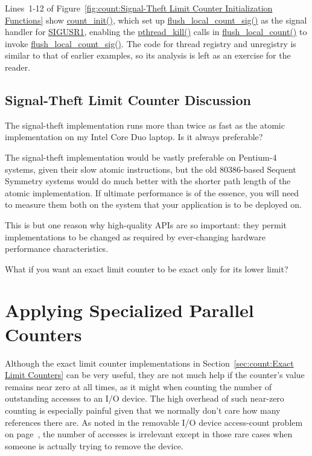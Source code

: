 Lines~1-12 of
Figure~\ref{fig:count:Signal-Theft Limit Counter Initialization Functions}
show \url{count_init()}, which set up \url{flush_local_count_sig()}
as the signal handler for \url{SIGUSR1},
enabling the \url{pthread_kill()} calls in \url{flush_local_count()}
to invoke \url{flush_local_count_sig()}.
The code for thread registry and unregistry is similar to that of
earlier examples, so its analysis is left as an exercise for the
reader.

\subsection{Signal-Theft Limit Counter Discussion}

The signal-theft implementation runs more than twice as fast as the
atomic implementation on my Intel Core Duo laptop.
Is it always preferable?

The signal-theft implementation would be vastly preferable on Pentium-4
systems, given their slow atomic instructions, but the old 80386-based
Sequent Symmetry systems would do much better with the shorter path
length of the atomic implementation.
If ultimate performance is of the essence, you will need to measure
them both on the system that your application is to be deployed on.

This is but one reason why high-quality APIs are so important:
they permit implementations to be changed as required by ever-changing
hardware performance characteristics.

\QuickQuiz{}
	What if you want an exact limit counter to be exact only for
	its lower limit?
 \QuickQuizEnd

\section{Applying Specialized Parallel Counters}
\label{sec:count:Applying Specialized Parallel Counters}

Although the exact limit counter implementations in
Section~\ref{sec:count:Exact Limit Counters}
can be very useful, they are not much help if the counter's value
remains near zero at all times, as it might when counting the number
of outstanding accesses to an I/O device.
The high overhead of such near-zero counting is especially painful
given that we normally don't care how many references there are.
As noted in the removable I/O device access-count problem on
page~\pageref{chp:Counting},
the number of accesses is irrelevant except in those rare cases when
someone is actually trying to remove the device.

